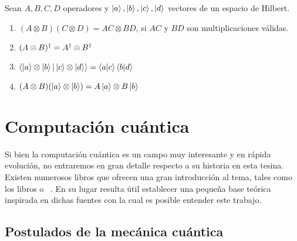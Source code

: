 \begin{propiedades} Sean $A, B, C, D$ operadores y $\ket{a}, \ket{b}, \ket{c}, \ket{d}$ vectores de un espacio de Hilbert.

  \begin{multicols}{2}
    \begin{enumerate}
    \item $(A\otimes B)(C\otimes D) = AC \otimes BD$, si $AC$ y $BD$ son multiplicaciones válidas.
    \item $(A\otimes B)^\dagger = A^\dagger\otimes B^\dagger$
    \item $\braket{\ket{a}\otimes \ket{b} | \ket{c} \otimes \ket{d}} = \braket{a|c}\braket{b|d}$ %
    \item $(A\otimes B) (\ket{a} \otimes \ket{b}) = A\ket{a} \otimes B\ket{b}$ 
    \end{enumerate}
  \end{multicols}
    
\end{propiedades}

\section{Computación cuántica}
 
Si bien la computación cuántica es un campo muy interesante y en rápida evolución, no entraremos en gran detalle respecto a su historia en esta tesina. Existen numerosos libros que ofrecen una gran introducción al tema, tales como los libros \cite{purification} o ~\cite{quantum_computer_science}. En su lugar resulta útil establecer una pequeña base teórica inspirada en dichas fuentes con la cual es posible entender este trabajo.



\subsection{Postulados de la mecánica cuántica}

